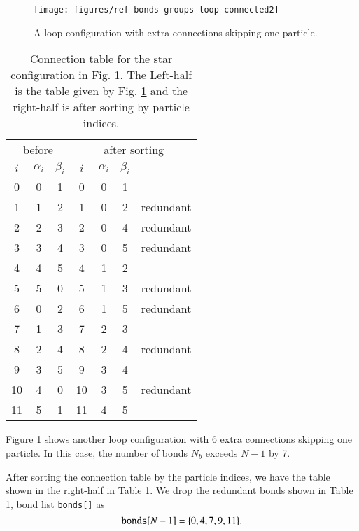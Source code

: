 \begin{figure}
  \centering
  \texttt{[image: figures/ref-bonds-groups-loop-connected2]}
  \caption{
    A loop configuration with extra connections skipping one particle.
  }
  \label{fig:ref-bonds-groups-loop-connected2}
\end{figure}
\begin{table}[!htb]
  \begin{tabular}{ccc|cccc}
    \multicolumn{3}{c|}{before} &
    \multicolumn{4}{c}{after sorting} \\
    $i$ & $\alpha_{i}$ & $\beta_{i}$ & 
    $i$ & $\alpha_{i}$ & $\beta_{i}$ & \\
    \hline
    0  & 0 & 1 & 0  & 0 & 1 & \\
    1  & 1 & 2 & 1  & 0 & 2 & redundant\\
    2  & 2 & 3 & 2  & 0 & 4 & redundant\\
    3  & 3 & 4 & 3  & 0 & 5 & redundant\\
    4  & 4 & 5 & 4  & 1 & 2 & \\
    5  & 5 & 0 & 5  & 1 & 3 & redundant\\
    6  & 0 & 2 & 6  & 1 & 5 & redundant\\
    7  & 1 & 3 & 7  & 2 & 3 & \\
    8  & 2 & 4 & 8  & 2 & 4 & redundant\\
    9  & 3 & 5 & 9  & 3 & 4 & \\
    10 & 4 & 0 & 10 & 3 & 5 & redundant\\
    11 & 5 & 1 & 11 & 4 & 5 & 
  \end{tabular}
  \caption{%
    Connection table for the star configuration 
    in Fig. \ref{fig:ref-bonds-groups-loop-connected2}.
    The Left-half is the table given by 
    Fig. \ref{fig:ref-bonds-groups-loop-connected2} 
    and the right-half is after sorting by particle indices. 
  }
  \label{tab:ref-bonds-groups-loop-connected2}
\end{table}
Figure \ref{fig:ref-bonds-groups-loop-connected2} 
shows another loop configuration 
with 6 extra connections skipping one particle. 
In this case, the number of bonds $N_{b}$ exceeds $N-1$ by 7. 

After sorting the connection table by the particle indices, 
we have the table shown in the right-half in 
Table \ref{tab:ref-bonds-groups-loop-connected2}. 
We drop the redundant bonds shown in 
Table \ref{tab:ref-bonds-groups-loop-connected2}, 
bond list {\tt bonds[]} as 
\begin{equation}
  {\tt bonds}[N-1] = \{0, 4, 7, 9, 11\}.
\end{equation}


